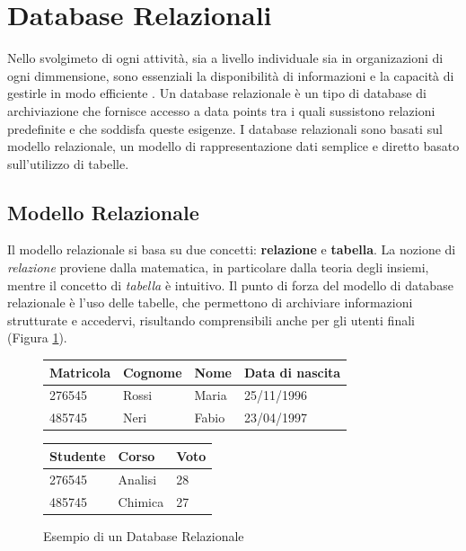 \section{Database Relazionali}
Nello svolgimeto di ogni attività, sia a livello individuale sia in organizazioni di ogni dimmensione, sono essenziali la disponibilità di informazioni e la capacità di gestirle in modo efficiente \cite{book:basididati}. Un database relazionale è un tipo di database di archiviazione che fornisce accesso a data points tra i quali sussistono relazioni predefinite e che soddisfa queste esigenze. I database relazionali sono basati sul modello relazionale, un modello di rappresentazione dati semplice e diretto basato sull'utilizzo di tabelle.

\subsection{Modello Relazionale}
Il modello relazionale si basa su due concetti: \textbf{relazione} e \textbf{tabella}. La nozione di \textit{relazione} proviene dalla matematica, in particolare dalla teoria degli insiemi, mentre il concetto di \textit{tabella} è intuitivo. Il punto di forza del modello di database relazionale è l'uso delle tabelle, che permettono di archiviare informazioni strutturate e accedervi, risultando comprensibili anche per gli utenti finali (Figura \ref{fig:example-relationaldatabase}).
\begin{figure}
    \begin{table}[H]
        \centering
        \begin{tabular}{ |p{2cm}||p{2cm}|p{2cm}|p{3cm}|  }
            \hline
            Matricola & Cognome & Nome  & Data di nascita \\
            \hline
            276545    & Rossi   & Maria & 25/11/1996      \\
            485745    & Neri    & Fabio & 23/04/1997      \\
            \hline
        \end{tabular}
    \end{table}
    \begin{table}[H]
        \centering
        \begin{tabular}{ |p{2cm}||p{2cm}|p{2cm}|  }
            \hline
            Studente & Corso   & Voto \\
            \hline
            276545   & Analisi & 28   \\
            485745   & Chimica & 27   \\
            \hline
        \end{tabular}
    \end{table}
    \caption{Esempio di un Database Relazionale}
    \label{fig:example-relationaldatabase}
\end{figure}
